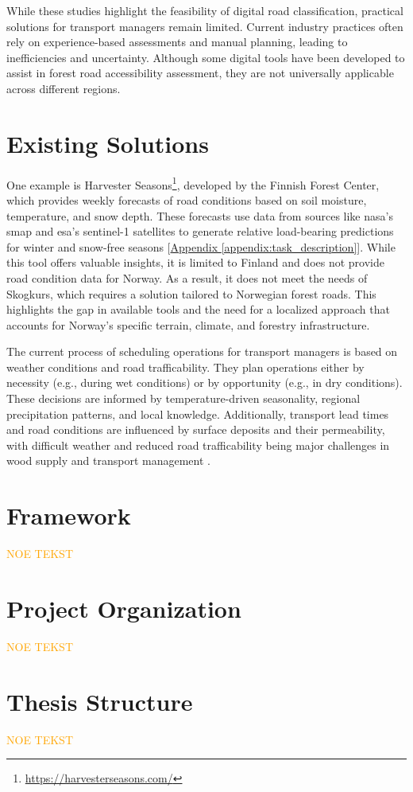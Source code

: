 While these studies highlight the feasibility of digital road classification, practical solutions for transport managers remain limited. Current industry practices often rely on experience-based assessments and manual planning, leading to inefficiencies and uncertainty. Although some digital tools have been developed to assist in forest road accessibility assessment, they are not universally applicable across different regions.

\section{Existing Solutions}

One example is Harvester Seasons\footnote{\url{https://harvesterseasons.com/}}, developed by the Finnish Forest Center, which provides weekly forecasts of road conditions based on soil moisture, temperature, and snow depth. These forecasts use data from sources like \acrshort{nasa}'s \gls{smap} and \acrshort{esa}'s \Gls{sentinel-1} satellites to generate relative load-bearing predictions for winter and snow-free seasons [\hyperref[appendix:task_description]{Appendix \ref*{appendix:task_description}}]. While this tool offers valuable insights, it is limited to Finland and does not provide road condition data for Norway. As a result, it does not meet the needs of Skogkurs, which requires a solution tailored to Norwegian forest roads. This highlights the gap in available tools and the need for a localized approach that accounts for Norway’s specific terrain, climate, and forestry infrastructure.

The current process of scheduling operations for transport managers is based on weather conditions and road \gls{trafficability}. They plan operations either by necessity (e.g., during wet conditions) or by opportunity (e.g., in dry conditions). These decisions are informed by temperature-driven seasonality, regional precipitation patterns, and local knowledge. Additionally, transport lead times and road conditions are influenced by surface deposits and their \gls{permeability}, with difficult weather and reduced road \gls{trafficability} being major challenges in wood supply and transport management \cite{fjeld2023trafficability}. 

\section{Framework}

\textcolor{orange}{NOE TEKST}

\section{Project Organization}

\textcolor{orange}{NOE TEKST}

\section{Thesis Structure}

\textcolor{orange}{NOE TEKST}
